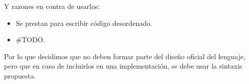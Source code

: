 {\begin{designfr}
Y razones en contra de usarlos:

\begin{itemize}
    \item Se prestan para escribir código desordenado.
    \item \#TODO.
\end{itemize}

Por lo que decidimos que no deben formar parte del diseño oficial del lenguaje, pero que en caso de incluirlos en una implementación, se debe usar la sintaxis propuesta.
\end{designfr}

}
